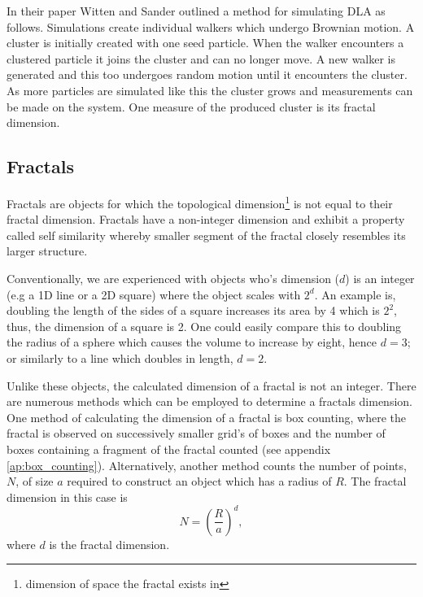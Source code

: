 \documentclass[%
 aapm,
 mph,%
 amsmath,amssymb,
 reprint,%
]{revtex4-2}
\begin{document}
In their paper Witten and Sander outlined a method for simulating DLA as follows\cite{WittenDLA}. Simulations create individual walkers which undergo Brownian motion. A cluster is initially created with one seed particle. When the walker encounters a clustered particle it joins the cluster and can no longer move. A new walker is generated and this too undergoes random motion until it encounters the cluster. As more particles are simulated like this the cluster grows and measurements can be made on the system. One measure of the produced cluster is its fractal dimension.
\subsection{\label{sec:fractals}Fractals}
Fractals are objects for which the topological dimension\footnote{dimension of space the fractal exists in} is not equal to their fractal dimension\cite{FractalsBook}. Fractals have a non-integer dimension and exhibit a property called self similarity whereby smaller segment of the fractal closely resembles its larger structure.

Conventionally, we are experienced with objects who's dimension ($d$) is an integer (e.g a 1D line or a 2D square) where the object scales with $2^d$. 
An example is, doubling the length of the sides of a square increases its area by 4 which is $2^2$, thus, the dimension of a square is 2. One could easily compare this to doubling the radius of a sphere which causes the volume to increase by eight, hence $d=3$; or similarly to a line which doubles in length, $d=2$. 

Unlike these objects, the calculated dimension of a fractal is not an integer. There are numerous methods which can be employed to determine a fractals dimension. One method of calculating the dimension of a fractal is box counting, where the fractal is observed on successively smaller grid's of boxes and the number of boxes containing a fragment of the fractal counted (see appendix \ref{ap:box_counting}). Alternatively, another method counts the number of points, $N$, of size $a$ required to construct an object which has a radius of $R$. The fractal dimension in this case is
\begin{equation}
\label{eq:FractalDimensionRelation}
N = \left ( \frac{R}{a} \right )^d,
\end{equation}
where $d$ is the fractal dimension\cite{CompBCoursework}. 
\end{document}
